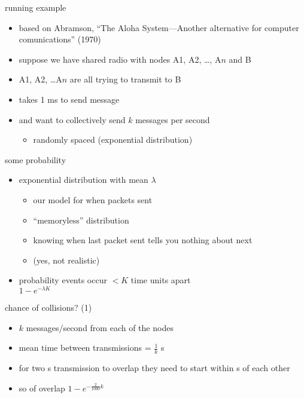 \begin{frame}{running example}
\begin{itemize}
    \item based on Abramson, ``The Aloha System---Another alternative for computer comunications'' (1970)
    \vspace{.5cm}
    \item suppose we have shared radio with nodes A1, A2, \ldots, A$n$ and B
    \vspace{.5cm}
    \item A1, A2, \ldots A$n$ are all trying to transmit to B
    \item takes 1 ms to send message
    \item and want to collectively send $k$ messages per second
        \begin{itemize}
        \item randomly spaced (exponential distribution)
        \end{itemize}
\end{itemize}
\end{frame}

\begin{frame}{some probability}
    \begin{itemize}
    \item exponential distribution with mean $\lambda$
        \begin{itemize}
        \item our model for when packets sent
        \item ``memoryless'' distribution
        \item knowing when last packet sent tells you nothing about next
        \item (yes, not realistic)
        \end{itemize}
    \vspace{.5cm}
    \item probability events occur $< K$ time units apart \\
    $1-e^{-\lambda K}$
    \end{itemize}
\end{frame}


\begin{frame}{chance of collisions? (1)}
    \begin{itemize}
    \item $k$ messages/second from each of the nodes
    \item mean time between transmissions = $\frac{1}{k}$ s
    \item for two  s transmission to overlap they need to start
        within  s of each other
    \vspace{.5cm}
    \item so of overlap $1-e^{-\frac{2}{1000}k}$
    \end{itemize}
\end{frame}

